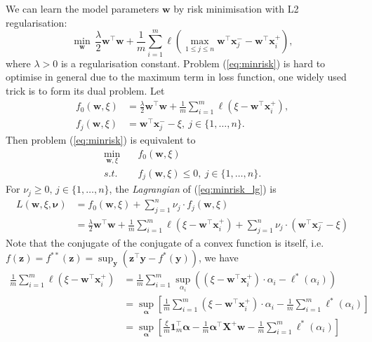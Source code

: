 \documentclass[9pt]{extarticle}
\newcommand{\x}{\mathbf{x}}
\newcommand{\X}{\mathbf{X}}
\newcommand{\y}{\mathbf{y}}
\newcommand{\z}{\mathbf{z}}
\newcommand{\1}{\mathbf{1}}
\newcommand{\w}{\mathbf{w}}
\newcommand{\alphabm}{\bm{\alpha}}
\newcommand{\nubm}{\bm{\nu}}
\newcommand{\ie}{i.e.\ }
\begin{document}
We can learn the model parameters $\w$ by risk minimisation with L2 regularisation:
\begin{equation}
\label{eq:minrisk}
\min_{\w} \, \frac{\lambda}{2} \w^\top \w + \frac{1}{m} \sum_{i=1}^m \ell\left( \max_{1 \le j \le n} \w^\top \x_j^- - \w^\top \x_i^+ \right),
\end{equation}
where $\lambda > 0$ is a regularisation constant.
Problem (\ref{eq:minrisk}) is hard to optimise in general due to the maximum term in loss function, one widely used trick is to form its dual problem.
Let 
\begin{equation*}
\begin{aligned}
f_0 (\w, \xi) &= \frac{\lambda}{2} \w^\top \w + \frac{1}{m} \sum_{i=1}^m \ell\left( \xi - \w^\top \x_i^+ \right), \\
f_j (\w, \xi) &= \w^\top \x_j^- - \xi, \ j \in \{1,\dots,n\}.
\end{aligned}
\end{equation*}
Then problem (\ref{eq:minrisk}) is equivalent to
\begin{equation}
\label{eq:minrisk_lg}
\begin{aligned}
\min_{\w, \xi} \quad & f_0 (\w, \xi) \\
s.t. \quad & f_j (\w, \xi) \le 0, \ j \in \{1,\dots,n\}.
\end{aligned}
\end{equation}
For $\nu_j \ge 0, \, j \in \{1,\dots,n\}$, the \emph{Lagrangian} of (\ref{eq:minrisk_lg}) is
\begin{equation}
\label{eq:minrisk_lg1}
\begin{aligned}
L(\w, \xi, \nubm) 
&= f_0 (\w, \xi) + \sum_{j=1}^n \nu_j \cdot f_j(\w, \xi) \\
&= \frac{\lambda}{2} \w^\top \w + \frac{1}{m} \sum_{i=1}^m \ell\left( \xi - \w^\top \x_i^+ \right) + \sum_{j=1}^n \nu_j \cdot \left( \w^\top \x_j^- - \xi \right)
\end{aligned}
\end{equation}
Note that the conjugate of the conjugate of a convex function is itself, \ie $f(\z) = f^{**}(\z) = \sup_{\y} \left( \z^\top \y - f^*(\y) \right)$, we have
\begin{equation}
\label{eq:lg_part1}
\begin{aligned}
\frac{1}{m} \sum_{i=1}^m \ell\left( \xi - \w^\top \x_i^+ \right)
&= \frac{1}{m} \sum_{i=1}^m \sup_{\alpha_i} \left( (\xi - \w^\top \x_i^+) \cdot \alpha_i - \ell^*(\alpha_i) \right) \\
&= \sup_{\alphabm} \left[ \frac{1}{m} \sum_{i=1}^m (\xi - \w^\top \x_i^+) \cdot \alpha_i - \frac{1}{m} \sum_{i=1}^m \ell^*(\alpha_i) \right] \\
&= \sup_{\alphabm} \left[ \frac{\xi}{m} \1_m^\top \alphabm - \frac{1}{m} \alphabm^\top \X^+ \w - \frac{1}{m} \sum_{i=1}^m \ell^*(\alpha_i) \right] \\
\end{aligned}
\end{equation}
\end{document}
